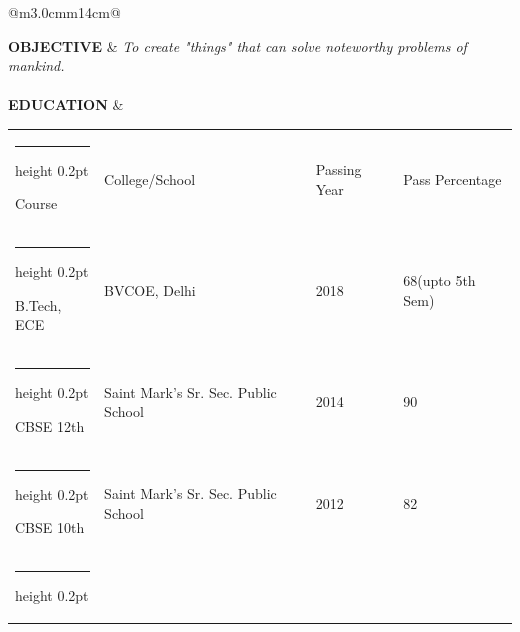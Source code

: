 \documentclass[a4paper]{article}
\makeatletter
\newcommand{\thinhline}
{
	\noalign {\ifnum 0=`}\fi \hrule height 0.2pt
	\futurelet \reserved@a \@xhline
}
\makeatother
\begin{document}
		\begin{longtable}{@{}m{3.0cm}m{14cm}@{}}
		
			\textrm{\textbf {OBJECTIVE}} & \textit{To create "things" that can solve noteworthy problems of mankind.}
			\\ \\
					
		
			\textrm{\textbf {EDUCATION}} & 
				\begin{center}
					\begin{tabular}{ |m{4cm}| m{4cm}| m{2cm}| m{3cm}| }
						\thinhline
						{\begin{center} Course \end{center}} & {\begin{center} 
						College/School \end{center}} & {\begin{center} Passing Year \end{center}} 
						& {\begin{center} Pass Percentage \end{center}} \\
						\thinhline
    					B.Tech,  ECE & BVCOE, Delhi & 2018  & 68(upto 5th Sem)\\ 
		    			\thinhline
    					CBSE 12th & Saint Mark's Sr. Sec. Public School & {2014} & 90\\
    					\thinhline
		    			CBSE 10th & Saint Mark's Sr. Sec. Public School & 2012 & 82\\
    					\thinhline
  					\end{tabular}
				\end{center}
			\\ \\
			

\end{longtable}
\end{document}
